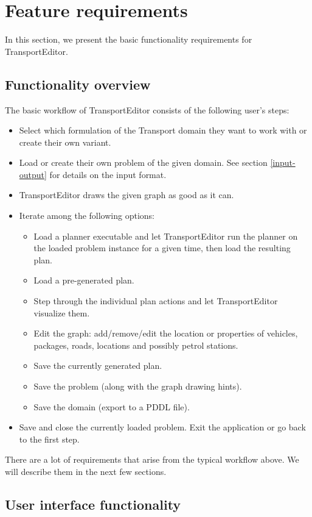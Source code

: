 \documentclass[10pt,a4paper,oneside]{article}
\newcommand{\pname}{TransportEditor} %
\begin{document}
\section{Feature requirements}

In this section, we present the basic functionality requirements for \pname{}.

\subsection{Functionality overview}

The basic workflow of \pname{} consists of the following user's steps:
\begin{itemize}
\item Select which formulation of the Transport domain they want to work with or create their own variant.
\item Load or create their own problem of the given domain. See section \ref{input-output} for details on the input format.
\item \pname{} draws the given graph as good as it can.
\item Iterate among the following options:
\begin{itemize}
\item Load a planner executable and let \pname{} run the planner on the loaded problem instance for a given time, then load the resulting plan.
\item Load a pre-generated plan.
\item Step through the individual plan actions and let \pname{} visualize them.
\item Edit the graph: add/remove/edit the location or properties of vehicles, packages, roads, locations and possibly petrol stations.
\item Save the currently generated plan.
\item Save the problem (along with the graph drawing hints).
\item Save the domain (export to a PDDL file).
\end{itemize}
\item Save and close the currently loaded problem. Exit the application or go back to the first step.
\end{itemize}

There are a lot of requirements that arise from the typical workflow above. We will describe them in the next few sections.

\subsection{User interface functionality} \label{ui}
\end{document}
